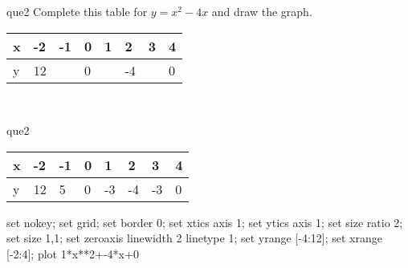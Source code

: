 \documentclass[13.5pt, varwidth=true]{beamer}
\begin{document}
\begin{frame}[shrink=19,fragile]
	\begin{beamercolorbox}[rounded=true, left, shadow=true,wd=14.8cm]{que2}
		 Complete this table for $y = x^{2} - 4x$ and draw the graph. \\[0.3cm] \renewcommand{\arraystretch}{1.2}\begin{tabular}{|C|C|C|C|C|C|C|C|} \hline x & -2 & -1 & 0 & 1 & 2 & 3 & 4 \\ \hline y & 12 &  & 0 &  & -4 &  & 0\\ \hline \end{tabular}\\[0.3cm]
	\end{beamercolorbox}
\end{frame}
\begin{frame}[shrink=19,fragile]
	\begin{beamercolorbox}[rounded=true, left, shadow=true,wd=14.8cm]{que2}
		\renewcommand{\arraystretch}{1.2}\begin{tabular}{|C|C|C|C|C|C|C|C|} \hline x & -2 & -1 & 0 & 1 & 2 & 3 & 4 \\ \hline y & 12 & 5 & 0 & -3 & -4 & -3 & 0\\ \hline \end{tabular}\begin{gnuplot}[terminal=pdf] set nokey; set grid; set border 0; set xtics axis 1; set ytics axis 1; set size ratio 2; set size 1,1; set zeroaxis linewidth 2 linetype 1; set yrange [-4:12]; set xrange [-2:4]; plot 1*x**2+-4*x+0 \end{gnuplot}
	\end{beamercolorbox}
\end{frame}
\end{document}
